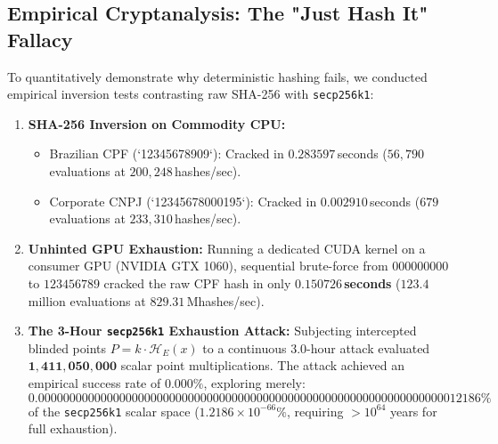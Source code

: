 \documentclass[10pt,a4paper]{article}
\begin{document}
\subsection{Empirical Cryptanalysis: The "Just Hash It" Fallacy}
To quantitatively demonstrate why deterministic hashing fails, we conducted empirical inversion tests contrasting raw SHA-256 with \texttt{secp256k1}:
\begin{enumerate}
    \item \textbf{SHA-256 Inversion on Commodity CPU:}
    \begin{itemize}
        \item Brazilian CPF (`12345678909`): Cracked in $\mathbf{0.283597}$\,seconds ($56{,}790$ evaluations at $200{,}248$\,hashes/sec).
        \item Corporate CNPJ (`12345678000195`): Cracked in $\mathbf{0.002910}$\,seconds ($679$ evaluations at $233{,}310$\,hashes/sec).
    \end{itemize}
    \item \textbf{Unhinted GPU Exhaustion:}
    Running a dedicated CUDA kernel on a consumer GPU (NVIDIA GTX 1060), sequential brute-force from $000000000$ to $123456789$ cracked the raw CPF hash in only $\mathbf{0.150726}$\,\textbf{seconds} ($123.4$ million evaluations at $829.31$\,Mhashes/sec).
    \item \textbf{The 3-Hour \texttt{secp256k1} Exhaustion Attack:}
    Subjecting intercepted blinded points $P = k \cdot \mathcal{H}_E(x)$ to a continuous 3.0-hour attack evaluated $\mathbf{1{,}411{,}050{,}000}$ scalar point multiplications. 
    The attack achieved an empirical success rate of $\mathbf{0.000\%}$, exploring merely:
    \begin{equation}
        \mathbf{0.00000000000000000000000000000000000000000000000000000000000000000012186\%}
    \end{equation}
    of the \texttt{secp256k1} scalar space ($1.2186 \times 10^{-66}\%$, requiring $> 10^{64}$ years for full exhaustion).
\end{enumerate}
\end{document}
